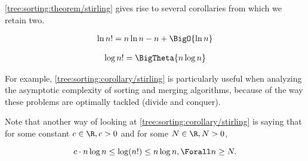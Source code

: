 \ref{tree:sorting:theorem/stirling} gives rise to several corollaries from
which we retain two.
\begin{corollary}
\begin{align*}
\ln n! &= n \ln n - n + \BigO{\ln n}\\
\end{align*}
\end{corollary}
\begin{corollary}
\label{tree:sorting:corollary/stirling}
\begin{align*}
\log n! &= \BigTheta{n \log n}\\
\end{align*}
\end{corollary}
For example, \ref{tree:sorting:corollary/stirling} is particularly useful
when analyzing the asymptotic complexity of sorting and merging algorithms, because
of the way these problems are optimally tackled (divide and conquer).

Note that another way of looking at \ref{tree:sorting:corollary/stirling} is
saying that for some constant $c \in \R, c > 0$ and for some $N \in \R, N > 0$,

\begin{displaymath}
c \cdot n \log n \leq \log(n!) \leq n \log n, \Forall n \geq N.
\end{displaymath}

